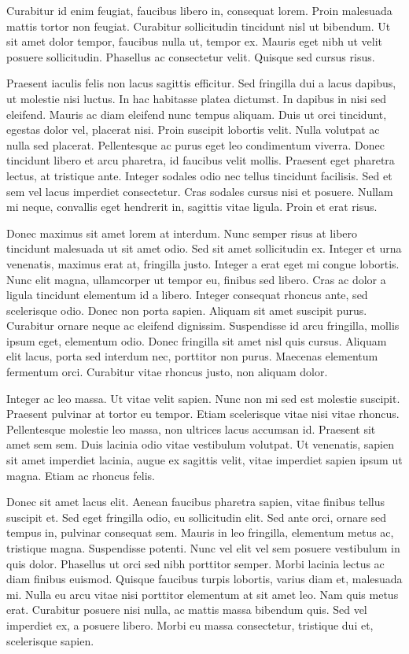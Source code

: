 \documentclass{sciposter}
\begin{document}
\begin{multicols}{3}
Curabitur id enim feugiat, faucibus libero in, consequat lorem. Proin malesuada mattis tortor non feugiat. Curabitur sollicitudin tincidunt nisl ut bibendum. Ut sit amet dolor tempor, faucibus nulla ut, tempor ex. Mauris eget nibh ut velit posuere sollicitudin. Phasellus ac consectetur velit. Quisque sed cursus risus.

Praesent iaculis felis non lacus sagittis efficitur. Sed fringilla dui a lacus dapibus, ut molestie nisi luctus. In hac habitasse platea dictumst. In dapibus in nisi sed eleifend. Mauris ac diam eleifend nunc tempus aliquam. Duis ut orci tincidunt, egestas dolor vel, placerat nisi. Proin suscipit lobortis velit. Nulla volutpat ac nulla sed placerat. Pellentesque ac purus eget leo condimentum viverra. Donec tincidunt libero et arcu pharetra, id faucibus velit mollis. Praesent eget pharetra lectus, at tristique ante. Integer sodales odio nec tellus tincidunt facilisis. Sed et sem vel lacus imperdiet consectetur. Cras sodales cursus nisi et posuere. Nullam mi neque, convallis eget hendrerit in, sagittis vitae ligula. Proin et erat risus.

Donec maximus sit amet lorem at interdum. Nunc semper risus at libero tincidunt malesuada ut sit amet odio. Sed sit amet sollicitudin ex. Integer et urna venenatis, maximus erat at, fringilla justo. Integer a erat eget mi congue lobortis. Nunc elit magna, ullamcorper ut tempor eu, finibus sed libero. Cras ac dolor a ligula tincidunt elementum id a libero. Integer consequat rhoncus ante, sed scelerisque odio. Donec non porta sapien. Aliquam sit amet suscipit purus. Curabitur ornare neque ac eleifend dignissim. Suspendisse id arcu fringilla, mollis ipsum eget, elementum odio. Donec fringilla sit amet nisl quis cursus. Aliquam elit lacus, porta sed interdum nec, porttitor non purus. Maecenas elementum fermentum orci. Curabitur vitae rhoncus justo, non aliquam dolor.

Integer ac leo massa. Ut vitae velit sapien. Nunc non mi sed est molestie suscipit. Praesent pulvinar at tortor eu tempor. Etiam scelerisque vitae nisi vitae rhoncus. Pellentesque molestie leo massa, non ultrices lacus accumsan id. Praesent sit amet sem sem. Duis lacinia odio vitae vestibulum volutpat. Ut venenatis, sapien sit amet imperdiet lacinia, augue ex sagittis velit, vitae imperdiet sapien ipsum ut magna. Etiam ac rhoncus felis.

Donec sit amet lacus elit. Aenean faucibus pharetra sapien, vitae finibus tellus suscipit et. Sed eget fringilla odio, eu sollicitudin elit. Sed ante orci, ornare sed tempus in, pulvinar consequat sem. Mauris in leo fringilla, elementum metus ac, tristique magna. Suspendisse potenti. Nunc vel elit vel sem posuere vestibulum in quis dolor. Phasellus ut orci sed nibh porttitor semper. Morbi lacinia lectus ac diam finibus euismod. Quisque faucibus turpis lobortis, varius diam et, malesuada mi. Nulla eu arcu vitae nisi porttitor elementum at sit amet leo. Nam quis metus erat. Curabitur posuere nisi nulla, ac mattis massa bibendum quis. Sed vel imperdiet ex, a posuere libero. Morbi eu massa consectetur, tristique dui et, scelerisque sapien.


\end{multicols}
\end{document}
